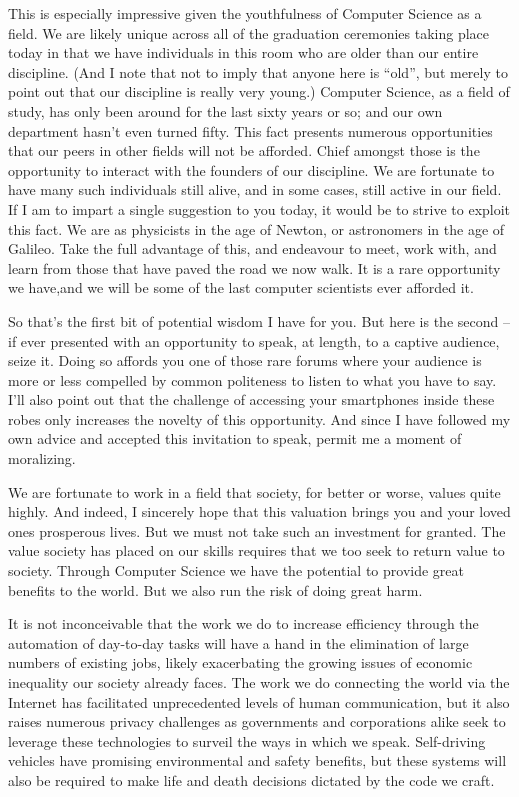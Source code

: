 \documentclass[11pt,twocolumn,letterpaper]{article}
\begin{document}
This is especially impressive given the youthfulness of Computer
Science as a field. We are likely unique across all of the graduation
ceremonies taking place today in that we have individuals in this room
who are older than our entire discipline. (And I note that not to
imply that anyone here is ``old'', but merely to point out that our
discipline is really very young.) Computer Science, as a field of
study, has only been around for the last sixty years or so; and our
own department hasn't even turned fifty. This fact presents numerous
opportunities that our peers in other fields will not be afforded.
Chief amongst those is the opportunity to interact with the founders
of our discipline. We are fortunate to have many such individuals
still alive, and in some cases, still active in our field. If I am to
impart a single suggestion to you today, it would be to strive to
exploit this fact. We are as physicists in the age of Newton, or
astronomers in the age of Galileo. Take the full advantage of this,
and endeavour to meet, work with, and learn from those that have paved
the road we now walk. It is a rare opportunity we have,and we will be
some of the last computer scientists ever afforded it.

So that's the first bit of potential wisdom I have for you. But here
is the second -- if ever presented with an opportunity to speak, at
length, to a captive audience, seize it. Doing so affords you one of
those rare forums where your audience is more or less compelled by
common politeness to listen to what you have to say. I'll also point
out that the challenge of accessing your smartphones inside these
robes only increases the novelty of this opportunity. And since I
have followed my own advice and accepted this invitation to speak,
permit me a moment of moralizing.

We are fortunate to work in a field that society, for better or worse,
values quite highly. And indeed, I sincerely hope that this valuation
brings you and your loved ones prosperous lives. But we must not take
such an investment for granted. The value society has placed on our
skills requires that we too seek to return value to society. Through
Computer Science we have the potential to provide great benefits to
the world. But we also run the risk of doing great harm.

It is not inconceivable that the work we do to increase efficiency
through the automation of day-to-day tasks will have a hand in the
elimination of large numbers of existing jobs, likely exacerbating the
growing issues of economic inequality our society already faces. The
work we do connecting the world via the Internet has facilitated
unprecedented levels of human communication, but it also raises
numerous privacy challenges as governments and corporations alike seek
to leverage these technologies to surveil the ways in which we speak.
Self-driving vehicles have promising environmental and safety
benefits, but these systems will also be required to make life and
death decisions dictated by the code we craft.
\end{document}
